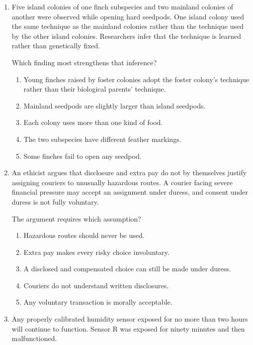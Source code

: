 \begin{enumerate}
\item Five island colonies of one finch subspecies and two mainland colonies of another were observed while opening hard seedpods. One island colony used the same technique as the mainland colonies rather than the technique used by the other island colonies. Researchers infer that the technique is learned rather than genetically fixed.

Which finding most strengthens that inference?
\begin{enumerate}
\item Young finches raised by foster colonies adopt the foster colony's technique rather than their biological parents' technique.
\item Mainland seedpods are slightly larger than island seedpods.
\item Each colony uses more than one kind of food.
\item The two subspecies have different feather markings.
\item Some finches fail to open any seedpod.
\end{enumerate}

\item An ethicist argues that disclosure and extra pay do not by themselves justify assigning couriers to unusually hazardous routes. A courier facing severe financial pressure may accept an assignment under duress, and consent under duress is not fully voluntary.

The argument requires which assumption?
\begin{enumerate}
\item Hazardous routes should never be used.
\item Extra pay makes every risky choice involuntary.
\item A disclosed and compensated choice can still be made under duress.
\item Couriers do not understand written disclosures.
\item Any voluntary transaction is morally acceptable.
\end{enumerate}

\item Any properly calibrated humidity sensor exposed for no more than two hours will continue to function. Sensor R was exposed for ninety minutes and then malfunctioned.


\end{enumerate}

